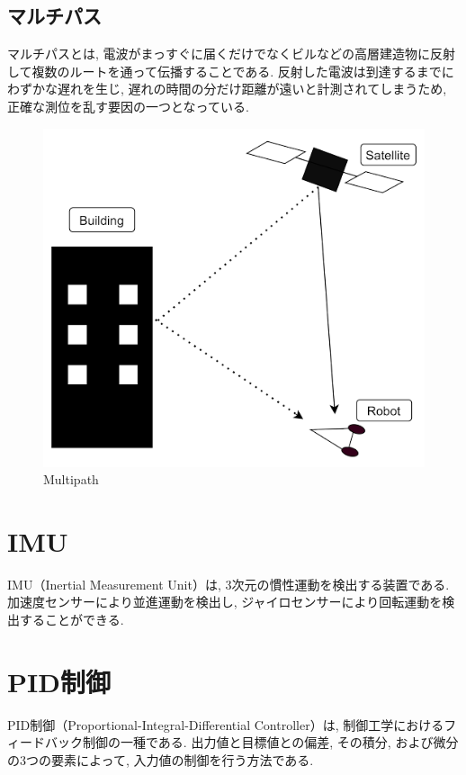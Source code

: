 \subsection{マルチパス}
マルチパスとは, 電波がまっすぐに届くだけでなくビルなどの高層建造物に反射して複数のルートを通って伝播することである.
反射した電波は到達するまでにわずかな遅れを生じ, 遅れの時間の分だけ距離が遠いと計測されてしまうため, 正確な測位を乱す要因の一つとなっている.

\begin{figure}[H]
  \centering
 \includegraphics[keepaspectratio, scale=0.4]
      {images/multipath.png}
 \caption{Multipath}
 \label{fig:multipath}
\end{figure}

\section{IMU}
IMU（Inertial Measurement Unit）は, 
3次元の慣性運動を検出する装置である. 
加速度センサーにより並進運動を検出し, 
ジャイロセンサーにより回転運動を検出することができる.

\section{PID制御}
PID制御（Proportional-Integral-Differential Controller）は, 制御工学におけるフィードバック制御の一種である.
出力値と目標値との偏差, その積分, および微分の3つの要素によって, 入力値の制御を行う方法である.

